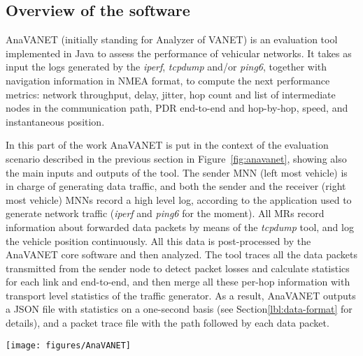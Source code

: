 \documentclass[fonts]{icst}
\begin{document}
\subsection{Overview of the software}

AnaVANET (initially standing for Analyzer of VANET) is an evaluation tool implemented in Java to assess the performance of vehicular networks. It takes as input the logs generated by the \textit{iperf}, \textit{tcpdump} and/or \textit{ping6}, together with navigation information in NMEA format, to compute the next performance metrics: network throughput, delay, jitter, hop count and list of intermediate nodes in the communication path, PDR end-to-end and hop-by-hop, speed, and instantaneous position. 

In this part of the work AnaVANET is put in the context of the evaluation scenario described in the previous section in Figure~\ref{fig:anavanet}, showing also the main inputs and outputs of the tool. The sender MNN (left most vehicle) is in charge of generating data traffic, and both the sender and the receiver (right most vehicle) MNNs record a high level log,
according to the application used to generate network traffic (\textit{iperf} and \textit{ping6} for the moment). All MRs record information about forwarded data packets by means of the \textit{tcpdump} tool, and log the vehicle position continuously. All this data is post-processed by the
AnaVANET core software and then analyzed. The tool traces all the data
packets transmitted from the sender node to detect
packet losses and calculate statistics for each link and end-to-end, and then merge
all these per-hop information with transport level statistics of the traffic
generator. As a result, AnaVANET outputs a JSON file with statistics on a
one-second basis (see Section\ref{lbl:data-format} for details), and a packet trace file with the path followed by each data packet. 

\begin{figure*}[htbp]
   \begin{center}
    \texttt{[image: figures/AnaVANET]}
  \caption{Overview of AnaVANET}
  \label{fig:anavanet}
  \end{center}
\end{figure*}
\end{document}
